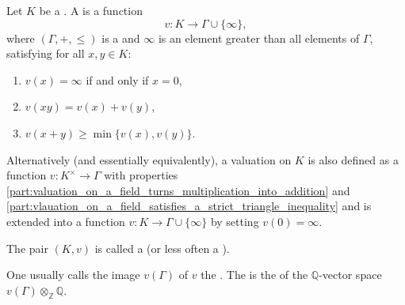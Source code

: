 \begin{definition} \label{definition:valuation_on_a_field}
Let $K$ be a . A  is a function
$$v : K \to \Gamma \cup \{\infty\},$$
where $(\Gamma, +, \leq)$ is a  and $\infty$ is an element greater than all elements of $\Gamma$, satisfying for all $x, y \in K$:
\begin{enumerate}
    \item $v(x) = \infty$ if and only if $x = 0$,
    \item $v(xy) = v(x) + v(y)$, \label{part:valuation_on_a_field_turns_multiplication_into_addition}
    \item $v(x + y) \geq \min\{v(x), v(y)\}$. \label{part:vlauation_on_a_field_satisfies_a_strict_triangle_inequality}
\end{enumerate}

Alternatively (and essentially equivalently), a valuation on $K$ is also defined as a function $v: K^\times \to \Gamma$ with properties \eqref{part:valuation_on_a_field_turns_multiplication_into_addition} and \eqref{part:vlauation_on_a_field_satisfies_a_strict_triangle_inequality} and is extended into a function $v: K \to \Gamma \cup \{\infty\}$ by setting $v(0) = \infty$.

The pair $(K, v)$ is called a  (or less often a ).

One usually calls the image $v(\Gamma)$ of $v$ the . The  is the  of the $\mathbb{Q}$-vector space $v(\Gamma) \otimes_{\mathbb{Z}} \mathbb{Q}$.

\end{definition}
